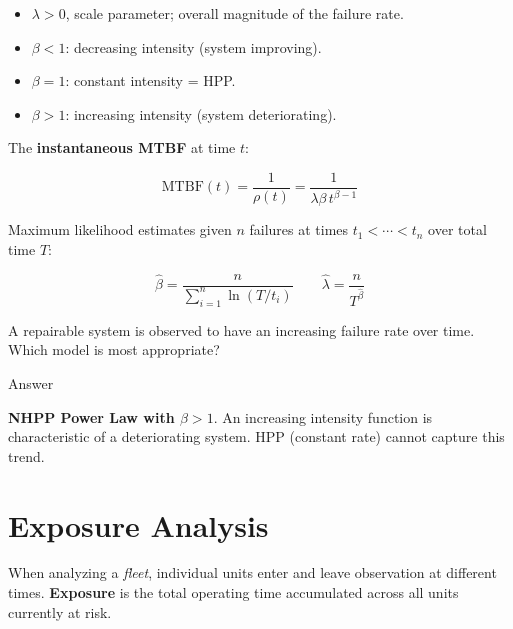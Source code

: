 \documentclass[
  letterpaper,
  DIV=11,
  numbers=noendperiod]{scrreprt}
\providecommand{\tightlist}{%
  \setlength{\itemsep}{0pt}\setlength{\parskip}{0pt}}
\begin{document}
\begin{itemize}
\tightlist
\item
  \(\lambda > 0\), scale parameter; overall magnitude of the failure
  rate.
\item
  \(\beta < 1\): decreasing intensity (system improving).
\item
  \(\beta = 1\): constant intensity = HPP.
\item
  \(\beta > 1\): increasing intensity (system deteriorating).
\end{itemize}

The \textbf{instantaneous MTBF} at time \(t\):

\[\text{MTBF}(t) = \frac{1}{\rho(t)} = \frac{1}{\lambda\beta\,t^{\beta-1}}\]

Maximum likelihood estimates given \(n\) failures at times
\(t_1 < \cdots < t_n\) over total time \(T\):

\[\hat{\beta} = \frac{n}{\displaystyle\sum_{i=1}^{n} \ln(T/t_i)} \qquad \hat{\lambda} = \frac{n}{T^{\hat{\beta}}}\]

\begin{tcolorbox}[enhanced jigsaw, arc=.35mm, bottomrule=.15mm, bottomtitle=1mm, breakable, colback=white, colbacktitle=quarto-callout-tip-color!10!white, colframe=quarto-callout-tip-color-frame, coltitle=black, left=2mm, leftrule=.75mm, opacityback=0, opacitybacktitle=0.6, rightrule=.15mm, title=\textcolor{quarto-callout-tip-color}{\faLightbulb}\hspace{0.5em}{Review}, titlerule=0mm, toprule=.15mm, toptitle=1mm]

A repairable system is observed to have an increasing failure rate over
time. Which model is most appropriate?

Answer

\textbf{NHPP Power Law with \(\beta > 1\)}. An increasing intensity
function is characteristic of a deteriorating system. HPP (constant
rate) cannot capture this trend.

\end{tcolorbox}

\section{Exposure Analysis}\label{exposure-analysis}

When analyzing a \emph{fleet}, individual units enter and leave
observation at different times. \textbf{Exposure} is the total operating
time accumulated across all units currently at risk.
\end{document}
